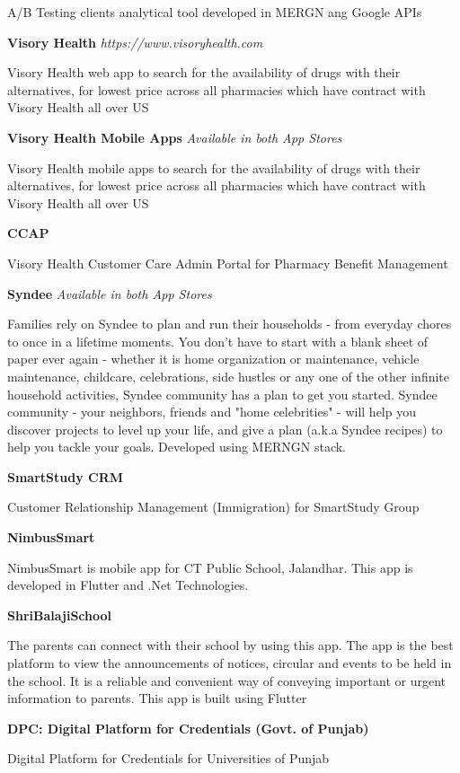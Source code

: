 \documentclass[margin,line]{res}
\begin{document}
\begin{resume}
A/B Testing clients analytical tool developed in MERGN ang Google APIs

\textbf{Visory Health} {\em https://www.visoryhealth.com}

Visory Health web app to search for the availability of drugs with their alternatives, for lowest price across all pharmacies which have contract with Visory Health all over US

\textbf{Visory Health Mobile Apps} {\em Available in both App Stores}

Visory Health mobile apps to search for the availability of drugs with their alternatives, for lowest price across all pharmacies which have contract with Visory Health all over US

\textbf{CCAP}

Visory Health Customer Care Admin Portal for Pharmacy Benefit Management

\textbf{Syndee} {\em Available in both App Stores}

Families rely on Syndee to plan and run their households - from everyday chores to once in a lifetime moments. You don't have to start with a blank sheet of paper ever again - whether it is home organization or maintenance, vehicle maintenance, childcare, celebrations, side hustles or any one of the other infinite household activities, Syndee community has a plan to get you started. Syndee community - your neighbors, friends and "home celebrities" - will help you discover projects to level up your life, and give a plan (a.k.a Syndee recipes) to help you tackle your goals. Developed using MERNGN stack.

\textbf{SmartStudy CRM}

Customer Relationship Management (Immigration) for SmartStudy Group

\textbf{NimbusSmart}

NimbusSmart is mobile app for CT Public School, Jalandhar. This app is developed in Flutter and .Net Technologies.

\textbf{ShriBalajiSchool}

The parents can connect with their school by using this app. The app is the best platform to view the announcements of notices, circular and events to be held in the school. It is a reliable and convenient way of conveying important or urgent information to parents. This app is built using Flutter

\textbf{DPC: Digital Platform for Credentials (Govt. of Punjab)}

Digital Platform for Credentials for Universities of Punjab


\end{resume}
\end{document}
